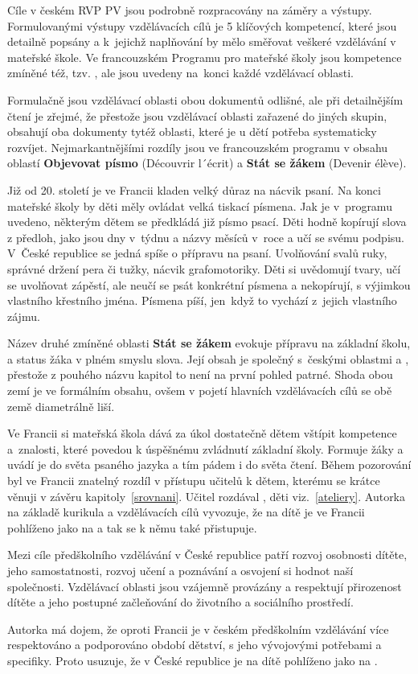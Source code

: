	Cíle v českém RVP PV jsou podrobně rozpracovány na záměry a výstupy. Formulovanými výstupy vzdělávacích cílů je 5 klíčových kompetencí, které jsou detailně popsány a k jejichž naplňování by mělo směřovat veškeré vzdělávání v mateřské škole. Ve francouzském Programu pro mateřské školy jsou kompetence zmíněné též, tzv. , ale jsou uvedeny na konci každé vzdělávací oblasti.

	Formulačně jsou vzdělávací oblasti obou dokumentů odlišné, ale při detailnějším čtení je zřejmé, že přestože jsou vzdělávací oblasti zařazené do jiných skupin, obsahují oba dokumenty tytéž oblasti, které je u dětí potřeba systematicky rozvíjet. Nejmarkantnějšími rozdíly jsou ve francouzském programu v obsahu oblastí \textbf{Objevovat písmo} (Découvrir l´écrit) a \textbf{Stát se žákem} (Devenir élève).

	Již od 20. století je ve Francii kladen velký důraz na nácvik psaní. Na konci mateřské školy by děti měly ovládat velká tiskací písmena. Jak je v programu uvedeno, některým dětem se předkládá již písmo psací. Děti hodně kopírují slova z předloh, jako jsou dny v týdnu a názvy měsíců v roce a učí se svému podpisu. V České republice se jedná spíše o přípravu na psaní. Uvolňování svalů ruky, správné držení pera či tužky, nácvik grafomotoriky. Děti si uvědomují tvary, učí se uvolňovat zápěstí, ale neučí se psát konkrétní písmena a nekopírují, s výjimkou vlastního křestního jména. Písmena píší, jen když to vychází z jejich vlastního zájmu. 

	Název druhé zmíněné oblasti \textbf{Stát se žákem} evokuje přípravu na základní školu, a status žáka v plném smyslu slova. Její obsah je společný s českými oblastmi  a , přestože z pouhého názvu kapitol to není na první pohled patrné. Shoda obou zemí je ve formálním obsahu, ovšem v pojetí hlavních vzdělávacích cílů se obě země diametrálně liší.

	Ve Francii si mateřská škola dává za úkol dostatečně dětem vštípit kompetence a znalosti, které povedou k úspěšnému zvládnutí základní školy. Formuje žáky a uvádí je do světa psaného jazyka a tím pádem i do světa čtení. Během pozorování byl ve Francii znatelný rozdíl v přístupu učitelů k dětem, kterému se krátce věnuji v závěru kapitoly~\ref{srovnani}. Učitel rozdával , děti  viz.~\ref{ateliery}. Autorka na základě kurikula a vzdělávacích cílů vyvozuje, že na dítě je ve Francii pohlíženo jako na  a tak se k němu také přistupuje. 

	Mezi cíle předškolního vzdělávání v České republice patří rozvoj osobnosti dítěte, jeho samostatnosti, rozvoj učení a poznávání a osvojení si hodnot naší společnosti. Vzdělávací oblasti jsou vzájemně provázány a respektují přirozenost dítěte a jeho postupné začleňování do životního a sociálního prostředí. 

	Autorka má dojem, že oproti Francii je v českém předškolním vzdělávání více respektováno a podporováno období dětství, s jeho vývojovými potřebami a specifiky. Proto usuzuje, že v České republice je na dítě pohlíženo jako na .
